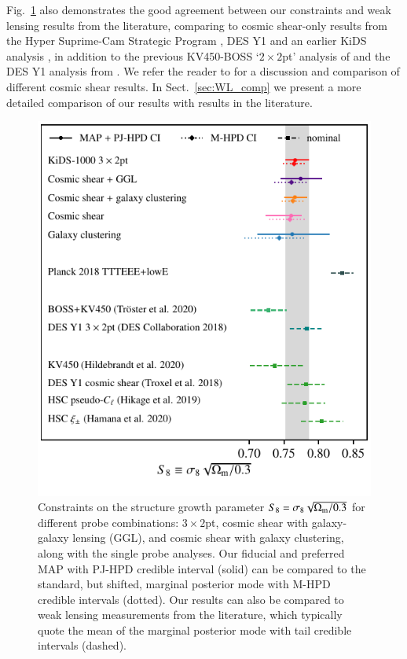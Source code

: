 Fig.~\ref{fig:S8comp} also demonstrates the good agreement between our constraints and weak lensing results from the literature, comparing to cosmic shear-only results from the Hyper Suprime-Cam Strategic Program \citep[HSC,][]{hikage/etal:2019,hamana/etal:2020}, DES Y1 \citep{troxel/etal:2018} and an earlier KiDS analysis \citep[KV450][]{hildebrandt/etal:2020}, in addition to the previous KV450-BOSS `$2\times2$pt' analysis of \citet{troester/etal:2020} and the DES Y1 \tttp analysis from \citet{abbott/etal:2018}.   We refer the reader to \citet{asgari/etal:inprep} for a discussion and comparison of different cosmic shear results.  In Sect.~\ref{sec:WL_comp} we present a more detailed comparison of our results with \tttp results in the literature.

\begin{figure}
	\begin{center}
		\includegraphics[width=\columnwidth]{Parameter_Plots/cosmology/S8_comparison_blindC}
		\caption{Constraints on the structure growth parameter $S_{8} = \sigma_8 \sqrt{\Omega_{\rm m}/0.3}$ for different probe combinations: $3\times2$pt, cosmic shear with galaxy-galaxy lensing (GGL), and cosmic shear with galaxy clustering, along with the single probe analyses.   Our fiducial and preferred MAP with PJ-HPD credible interval (solid) can be compared to the standard, but shifted, marginal posterior mode with M-HPD credible intervals (dotted).    Our results can also be compared to weak lensing measurements from the literature, which typically quote the mean of the marginal posterior mode with tail credible intervals (dashed). 
		\label{fig:S8comp}}
	\end{center}
\end{figure}

